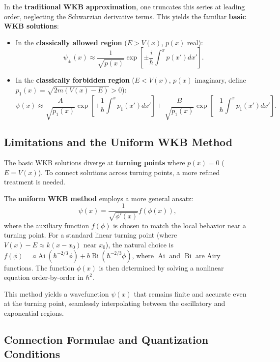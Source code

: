 In the \textbf{traditional WKB approximation}, one truncates this series at leading order, neglecting the Schwarzian derivative terms. This yields the familiar \textbf{basic WKB solutions}:
\begin{itemize}
	\item In the \textbf{classically allowed region} ($E > V(x)$, $p(x)$ real):
	\[
	\psi_{\pm}(x) \approx \frac{1}{\sqrt{p(x)}} \exp\left[ \pm \frac{i}{\hbar} \int^x p(x') dx' \right].
	\]
	\item In the \textbf{classically forbidden region} ($E < V(x)$, $p(x)$ imaginary, define $p_1(x) = \sqrt{2m(V(x)-E)} > 0$):
	\[
	\psi(x) \approx \frac{A}{\sqrt{p_1(x)}} \exp\left[ +\frac{1}{\hbar} \int^x p_1(x') dx' \right] + \frac{B}{\sqrt{p_1(x)}} \exp\left[ -\frac{1}{\hbar} \int^x p_1(x') dx' \right].
	\]
\end{itemize}

\subsection{Limitations and the Uniform WKB Method}
The basic WKB solutions diverge at \textbf{turning points} where $p(x)=0$ ($E = V(x)$). To connect solutions across turning points, a more refined treatment is needed.

The \textbf{uniform WKB method} employs a more general ansatz:
\[
\psi(x) = \frac{1}{\sqrt{\phi'(x)}} f(\phi(x)),
\]
where the auxiliary function $f(\phi)$ is chosen to match the local behavior near a turning point. For a standard linear turning point (where $V(x)-E \approx k(x-x_0)$ near $x_0$), the natural choice is $f(\phi) = a\operatorname{Ai}(\hbar^{-2/3}\phi) + b\operatorname{Bi}(\hbar^{-2/3}\phi)$, where $\operatorname{Ai}$ and $\operatorname{Bi}$ are Airy functions. The function $\phi(x)$ is then determined by solving a nonlinear equation order-by-order in $\hbar^2$.

This method yields a wavefunction $\psi(x)$ that remains finite and accurate even at the turning point, seamlessly interpolating between the oscillatory and exponential regions.

\subsection{Connection Formulae and Quantization Conditions}
